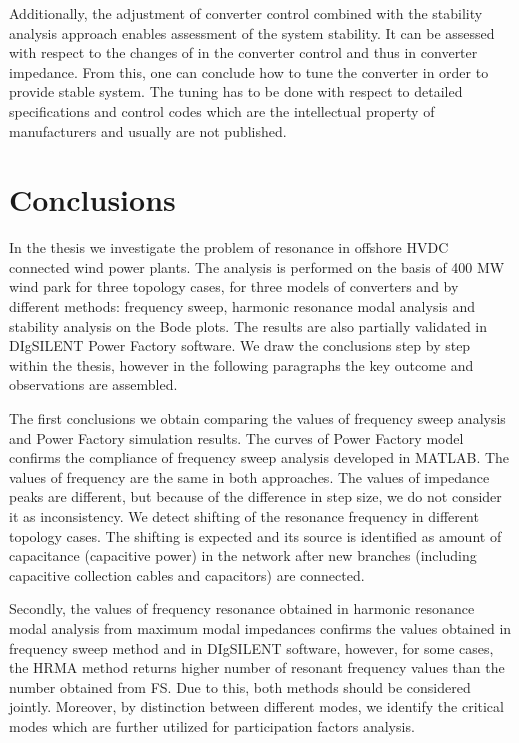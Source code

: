 \documentclass[a4paper,11pt,twoside,openright]{report}
\begin{document}
Additionally, the adjustment of converter control combined with the stability analysis approach enables assessment of the system stability. It can be assessed with respect to the changes of in the converter control and thus in converter impedance. From this, one can conclude how to tune the converter in order to provide stable system. The tuning has to be done with respect to detailed specifications and control codes which are the intellectual property of manufacturers and usually are not published.

\chapter{Conclusions}

In the thesis we investigate the problem of resonance in offshore HVDC connected wind power plants. The analysis is performed on the basis of 400 MW wind park for three topology cases, for three models of converters and by different methods: frequency sweep, harmonic resonance modal analysis and stability analysis on the Bode plots. The results are also partially validated in DIgSILENT Power Factory software. We draw the conclusions step by step within the thesis, however in the following paragraphs the key outcome and observations are assembled.

The first conclusions we obtain comparing the values of frequency sweep analysis and Power Factory simulation results. The curves of Power Factory model confirms the compliance of frequency sweep analysis developed in MATLAB. The values of frequency are the same in both approaches. The values of impedance peaks are different, but because of the difference in step size, we do not consider it as inconsistency. We detect shifting of the resonance frequency in different topology cases. The shifting is expected and its source is identified as amount of capacitance (capacitive power) in the network after new branches (including capacitive collection cables and capacitors) are connected.

Secondly, the values of frequency resonance obtained in harmonic resonance modal analysis from maximum modal impedances confirms the values obtained in frequency sweep method and in DIgSILENT software, however, for some cases, the HRMA method returns higher number of resonant frequency values than the number obtained from FS. Due to this, both methods should be considered jointly. Moreover, by distinction between different modes, we identify the critical modes which are further utilized for participation factors analysis.
\end{document}
